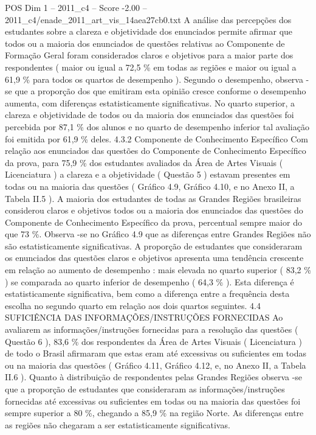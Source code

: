 \begin{textsample}{POS Dim 1 – 2011\_c4 – Score -2.00 – 2011\_c4/enade\_2011\_art\_vis\_14aea27cb0.txt}
A análise das percepções dos estudantes sobre a clareza e objetividade dos enunciados permite afirmar que todos ou a maioria dos enunciados de questões relativas ao Componente de Formação Geral foram considerados claros e objetivos para a maior parte dos respondentes ( maior ou igual a 72,5 \% em todas as regiões e maior ou igual a 61,9 \% para todos os quartos de desempenho ).
Segundo o desempenho, observa -se que a proporção dos que emitiram esta opinião cresce conforme o desempenho aumenta, com diferenças estatisticamente significativas.
No quarto superior, a clareza e objetividade de todos ou da maioria dos enunciados das questões foi percebida por 87,1 \% dos alunos e no quarto de desempenho inferior tal avaliação foi emitida por 61,9 \% deles. 4.3.2 Componente de Conhecimento Específico Com relação aos enunciados das questões do Componente de Conhecimento Específico da prova, para 75,9 \% dos estudantes avaliados da Área de Artes Visuais ( Licenciatura ) a clareza e a objetividade ( Questão 5 ) estavam presentes em todas ou na maioria das questões ( Gráfico 4.9, Gráfico 4.10, e no Anexo II, a Tabela II.5 ).
A maioria dos estudantes de todas as Grandes Regiões brasileiras considerou claros e objetivos todos ou a maioria dos enunciados das questões do Componente de Conhecimento Específico da prova, percentual sempre maior do que 73 \%.
Observa -se no Gráfico 4.9 que as diferenças entre Grandes Regiões não são estatisticamente significativas.
A proporção de estudantes que consideraram os enunciados das questões claros e objetivos apresenta uma tendência crescente em relação ao aumento de desempenho : mais elevada no quarto superior ( 83,2 \% ) se comparada ao quarto inferior de desempenho ( 64,3 \% ).
Esta diferença é estatisticamente significativa, bem como a diferença entre a frequência desta escolha no segundo quarto em relação aos dois quartos seguintes. 4.4 SUFICIÊNCIA DAS INFORMAÇÕES/INSTRUÇÕES FORNECIDAS Ao avaliarem as informações/instruções fornecidas para a resolução das questões ( Questão 6 ), 83,6 \% dos respondentes da Área de Artes Visuais ( Licenciatura ) de todo o Brasil afirmaram que estas eram até excessivas ou suficientes em todas ou na maioria das questões ( Gráfico 4.11, Gráfico 4.12, e, no Anexo II, a Tabela II.6 ).
Quanto à distribuição de respondentes pelas Grandes Regiões observa -se que a proporção de estudantes que consideraram as informações/instruções fornecidas até excessivas ou suficientes em todas ou na maioria das questões foi sempre superior a 80 \%, chegando a 85,9 \% na região Norte.
As diferenças entre as regiões não chegaram a ser estatisticamente significativas.

\end{textsample}
